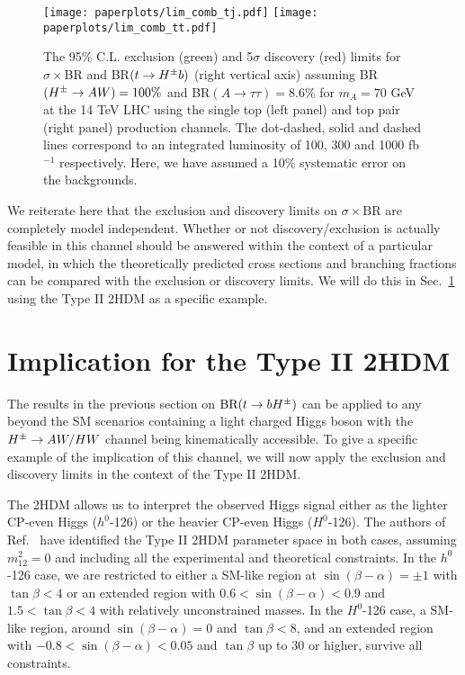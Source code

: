  \begin{figure}[h!]
 \centering
 	\texttt{[image: paperplots/lim\_comb\_tj.pdf]} \hspace{0.2 in}
 	\texttt{[image: paperplots/lim\_comb\_tt.pdf]}
\caption{The 95\% C.L. exclusion (green) and 5$\sigma$ discovery (red) limits for $\sigma \times $BR and BR$(t \to H^{\pm} b)$ (right vertical axis) assuming  BR$(H^{\pm}  \to A W)=100\%$ and  BR$(A \to \tau\tau)=8.6\%$ for $m_A = 70$ GeV at the 14 TeV LHC using the single top (left panel) and top pair (right panel) production channels. The dot-dashed, solid and dashed lines correspond to an integrated luminosity of 100, 300 and 1000 fb$^{-1}$ respectively. Here, we have assumed a 10\% systematic error on the backgrounds.   } 
\label{fig:ana_limits}
\end{figure}

 

We reiterate here that the exclusion and discovery limits  on $\sigma \times \text{BR}$  are completely model independent. Whether or not discovery/exclusion is actually feasible in this channel should be answered within the context of a particular model, in which the theoretically predicted cross sections and branching fractions can be compared with the exclusion or discovery limits.   We will do this in Sec.~\ref{sec:implication} using the Type II 2HDM as a specific example. 

\section{Implication for the Type II 2HDM}
 \label{sec:implication}

 The results in the previous section on $\text{BR}(t \rightarrow b H^{\pm})$ can be applied to any beyond the SM scenarios containing   a light charged Higgs boson with the $H^{\pm} \to AW/HW$ channel being kinematically accessible. To give a specific example of the   implication of this channel, we will now apply the exclusion and discovery limits in the context of the Type II 2HDM. 

 The 2HDM allows us to interpret the observed Higgs signal either as the lighter CP-even Higgs ($h^0$-126) or the heavier CP-even Higgs ($H^0$-126). The authors of Ref.~\cite{Coleppa:2013dya}  have identified  the Type II 2HDM parameter space in both cases, assuming  $m_{12}^2=0$  and including all the experimental and theoretical constraints. In the $h^0$-126 case,  we are restricted to either a SM-like region at $\sin(\beta-\alpha)=\pm1$ with $\tan\beta<4$ or an extended region with $0.6<\sin(\beta-\alpha)<0.9$ and $1.5<\tan\beta<4$ with relatively unconstrained masses. In the $H^0$-126 case,  a SM-like region, around $\sin(\beta-\alpha)=0$ and $\tan\beta<8$, and an extended region with $-0.8 < \sin(\beta-\alpha)<0.05$ and $\tan\beta$ up to 30 or higher, survive all constraints.   
 
